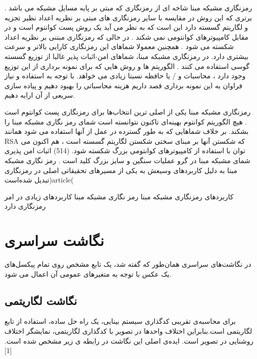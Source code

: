

رمزنگاری مشبکه مبنا شاخه ای از رمزنگاری که مبتی بر پایه مسایل مشبکه می باشد . برتری که این روش در مقایسه با سایر رمزنگاری های مبتی بر نظریه اعداد نظیر تجزیه و لگاریتم گسسته دارد این است که به نظر می آید یک روش پست کوانتوم است و در مقابل کامپیوترهای کوانتومی نمی شکند . در حالی که رمزنگاری مبتنی بر نظریه اعداد شکسته می شود . همچنین معمولا شماهای این رمزنگاری کارایی بالاتر و سرعت بیشتری دارد.  در رمزنگاری مشبکه مبنا، شماهای امن-اثبات پذیر غالبا از توزیع گسسته گوسی استفاده می کنند . الگوریتم ها و روش هایی که برای نمونه برداری از این توزیع وجود دارد ، محاسبات و / یا حافظه نسبتا زیادی می خواهد. با توجه به استفاده و نیاز فراوان به این نمونه برداری قصد داریم هزینه محاسباتی را بهبود دهیم و پیاده سازی سریعی از آن ارایه دهیم. 


رمزنگاری مشبکه مبنا یکی از اصلی ترین انتخاب‌ها برای رمزنگاری پست کوانتوم است . هیچ الگوریتم کوانتوم بهینه‌ای تاکنون نتوانسته است شمای رمز نگاری مشبکه مبنا را بشکند. بر خلاف شماهایی که به طور گسترده در عمل از آنها استفاده می شود همانند RSA  که شکستن آنها بر مبنای سختی شکستن لگاریتم گسسته است ، هم اکنون می توان با استفاده از کامپیوترهای کوانتومی بزرگ شکسته شود. (514) اثبات امن پذیری شمای مشبکه مبنا در گرو عملیات سنگین و سایز بزرگ کلید است . 
رمز نگاری مشبکه مبنا  به دلیل کاربردهای وسیعش به یکی از مسیرهای تحقیقاتی اصلی در رمزنگاری تبدیل شده‌است)article(

کاربردهای رمزنگاری مشبکه مبنا
رمز نگاری مشبکه مبنا کاربردهای زیادی در امر رمزنگاری دارد











\section{نگاشت سراسری}

در نگاشت‌های سراسری همان‌طور که گفته شد، یک تابع مشخص روی تمام پیکسل‌های یک عکس با توجه به متغیرهای عمومی آن اعمال می شود.

\subsection{نگاشت لگاریتمی}
برای محاسبه‌ی تقریبی کدگذاری سیستم بینایی، یک راه حل ساده، استفاده از تابع لگاریتمی است.بنابراین اختلاف واحدها در تصویر با کدگذاری لگاریتمی، نمایشگر اختلاف روشنایی در تصویر است. ایده‌ی اصلی این نگاشت در رابطه ی زیر مشخص شده است. [1] 

